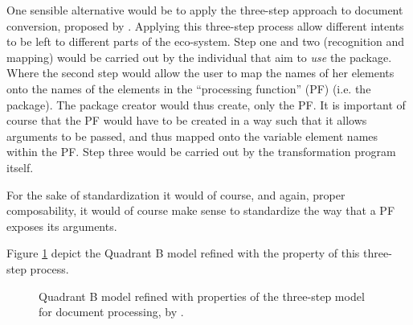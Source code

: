 \documentclass{scrreprt}
\begin{document}
One sensible alternative would be to apply the three-step approach to document conversion, proposed by \citet{goldfarb}. Applying this three-step process allow different intents to be left to different parts of the eco-system. Step one and two (recognition and mapping) would be carried out by the individual that aim to \emph{use} the package. Where the second step would allow the user to map the names of her elements onto the names of the elements in the ``processing function'' (PF) (i.e. the package). The package creator would thus create, only the PF. It is important of course that the PF would have to be created in a way such that it allows arguments to be passed, and thus mapped onto the variable element names within the PF.  Step three would be carried out by the transformation program itself.

For the sake of standardization it would of course, and again, proper composability, it would of course make sense to standardize the way that a PF exposes its arguments.

Figure \ref{fig:quad-b-with-three-step-process} depict the Quadrant B model refined with the property of this three-step process.

\begin{figure}[h]
  \centering


  \caption{Quadrant B model refined with properties of the three-step model for document processing, by \citet{goldfarb}.}
  \label{fig:quad-b-with-three-step-process}
\end{figure}
\end{document}
